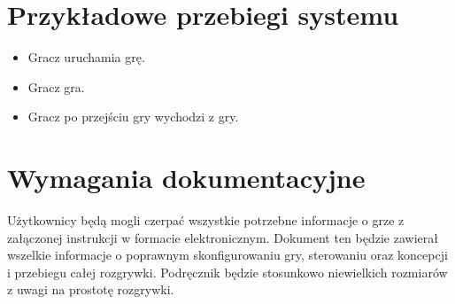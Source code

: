 \documentclass[12pt,a4paper,twoside]{article}
\begin{document}



\section{Przykładowe przebiegi systemu}
\begin{itemize}
\item Gracz uruchamia grę.
\item Gracz gra.
\item Gracz po przejściu gry wychodzi z gry.
\end{itemize}

\section{Wymagania dokumentacyjne}



Użytkownicy będą mogli czerpać wszystkie potrzebne informacje o grze z załączonej instrukcji w formacie elektronicznym. Dokument ten będzie zawierał wszelkie informacje o poprawnym skonfigurowaniu gry, sterowaniu oraz koncepcji i przebiegu całej rozgrywki. Podręcznik będzie stosunkowo niewielkich rozmiarów z uwagi na prostotę rozgrywki.

\end{document}
